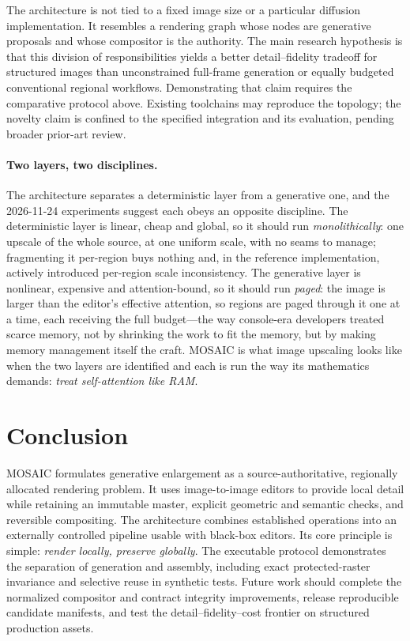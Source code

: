 \documentclass[10pt,twocolumn]{article}
\begin{document}
The architecture is not tied to a fixed image size or a particular diffusion implementation. It resembles a rendering graph whose nodes are generative proposals and whose compositor is the authority. The main research hypothesis is that this division of responsibilities yields a better detail--fidelity tradeoff for structured images than unconstrained full-frame generation or equally budgeted conventional regional workflows. Demonstrating that claim requires the comparative protocol above. Existing toolchains may reproduce the topology; the novelty claim is confined to the specified integration and its evaluation, pending broader prior-art review.
\paragraph{Two layers, two disciplines.} The architecture separates a deterministic layer from a generative one, and the 2026-11-24 experiments suggest each obeys an opposite discipline. The deterministic layer is linear, cheap and global, so it should run \emph{monolithically}: one upscale of the whole source, at one uniform scale, with no seams to manage; fragmenting it per-region buys nothing and, in the reference implementation, actively introduced per-region scale inconsistency. The generative layer is nonlinear, expensive and attention-bound, so it should run \emph{paged}: the image is larger than the editor's effective attention, so regions are paged through it one at a time, each receiving the full budget---the way console-era developers treated scarce memory, not by shrinking the work to fit the memory, but by making memory management itself the craft. MOSAIC is what image upscaling looks like when the two layers are identified and each is run the way its mathematics demands: \emph{treat self-attention like RAM}.

\section{Conclusion}
MOSAIC formulates generative enlargement as a source-authoritative, regionally allocated rendering problem. It uses image-to-image editors to provide local detail while retaining an immutable master, explicit geometric and semantic checks, and reversible compositing. The architecture combines established operations into an externally controlled pipeline usable with black-box editors. Its core principle is simple: \emph{render locally, preserve globally}. The executable protocol demonstrates the separation of generation and assembly, including exact protected-raster invariance and selective reuse in synthetic tests. Future work should complete the normalized compositor and contract integrity improvements, release reproducible candidate manifests, and test the detail--fidelity--cost frontier on structured production assets.
\end{document}

